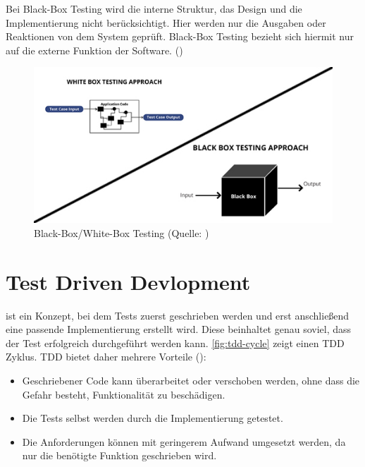 \documentclass[a4paper, fontsize=11pt, parskip=half, twoside, headings=openright]{scrreprt}
\begin{document}
	Bei Black-Box Testing wird die interne Struktur, das Design und die Implementierung nicht berücksichtigt.
	Hier werden nur die Ausgaben oder Reaktionen von dem System geprüft.
	Black-Box Testing bezieht sich hiermit nur auf die externe Funktion der Software. (\textcite[Seite 12]{nidhra_black_2012})
	
	\begin{figure}[ht]
		\centering
		\includegraphics[scale=0.6]{assets/WhiteBoxBlackBoxTesting.jpg}
		\caption{Black-Box/White-Box Testing (Quelle: \textcite{khandelwal_difference_2019})}
		\label{fig:WhiteBoxBlackBoxTesting}
	\end{figure}
	
	
	\section{Test Driven Devlopment}
	 ist ein Konzept, bei dem Tests zuerst geschrieben werden und erst anschließend eine passende Implementierung erstellt wird.
	Diese beinhaltet genau soviel, dass der Test erfolgreich durchgeführt werden kann.
	\autoref{fig:tdd-cycle} zeigt einen \ac{TDD} Zyklus.
	\ac{TDD} bietet daher mehrere Vorteile (\textcite{ammann_introduction_2016}):
	
	\begin{itemize}
		\item Geschriebener Code kann überarbeitet oder verschoben werden, ohne dass die Gefahr besteht, Funktionalität zu beschädigen.
		\item Die Tests selbst werden durch die Implementierung getestet.
		\item Die Anforderungen können mit geringerem Aufwand umgesetzt werden, da nur die benötigte Funktion geschrieben wird.
	\end{itemize}
	
\end{document}
